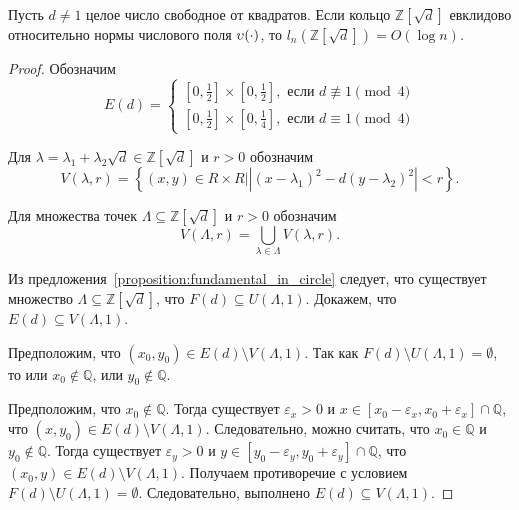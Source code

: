 \documentclass[_00_dissertation.tex]{subfiles}
\begin{document}
\begin{theorem}
    Пусть $d \neq 1$ целое число свободное от квадратов.
    Если кольцо $\mathbb{Z}[\sqrt{d}]$ евклидово относительно нормы числового поля $\upsilon(\cdot)$, то $l_n(\mathbb{Z}[\sqrt{d}]) = O(\log n)$.
\end{theorem}
\begin{proof}
    Обозначим
    \begin{equation*}
        E(d) = \begin{cases}
            \left[0, \frac{1}{2}\right] \times \left[0, \frac{1}{2}\right], \textrm{ если } d \not\equiv 1 \pmod 4\\
            \left[0, \frac{1}{2}\right] \times \left[0, \frac{1}{4}\right], \textrm{ если } d \equiv 1 \pmod 4
        \end{cases}
    \end{equation*}

    Для $\lambda = \lambda_1 + \lambda_2 \sqrt{d} \in \mathbb{Z}[\sqrt{d}]$ и $r > 0$ обозначим
    \begin{equation*}
        V(\lambda, r) = \left\{
            (x, y) \in R \times R \Big| \left|(x - \lambda_1)^2 - d(y - \lambda_2)^2\right| < r
        \right\}.
    \end{equation*}

    Для множества точек $\Lambda \subseteq \mathbb{Z}[\sqrt{d}]$ и $r > 0$ обозначим
    \begin{equation*}
        V(\Lambda, r) = \bigcup_{\lambda \in \Lambda} V(\lambda, r).
    \end{equation*}

    Из предложения~\ref{proposition:fundamental_in_circle} следует, что существует множество $\Lambda \subseteq \mathbb{Z}[\sqrt{d}]$, что $F(d) \subseteq U(\Lambda, 1)$.
    Докажем, что $E(d) \subseteq V(\Lambda, 1)$.

    Предположим, что $(x_0, y_0) \in E(d) \setminus V(\Lambda, 1)$.
    Так как $F(d) \setminus U(\Lambda, 1) = \emptyset$, то или $x_0 \not\in \mathbb{Q}$, или $y_0 \not\in \mathbb{Q}$.

    Предположим, что $x_0 \not\in \mathbb{Q}$.
    Тогда существует $\varepsilon_x > 0$ и $x \in [x_0 - \varepsilon_x, x_0 + \varepsilon_x] \cap \mathbb{Q}$, что $(x, y_0) \in E(d) \setminus V(\Lambda, 1)$.
    Следовательно, можно считать, что $x_0 \in \mathbb{Q}$ и $y_0 \not\in \mathbb{Q}$.
    Тогда существует $\varepsilon_y > 0$ и $y \in [y_0 - \varepsilon_y, y_0 + \varepsilon_y] \cap \mathbb{Q}$, что $(x_0, y) \in E(d) \setminus V(\Lambda, 1)$.
    Получаем противоречие с условием $F(d) \setminus U(\Lambda, 1) = \emptyset$.
    Следовательно, выполнено $E(d) \subseteq V(\Lambda, 1)$.


\end{proof}
\end{document}
